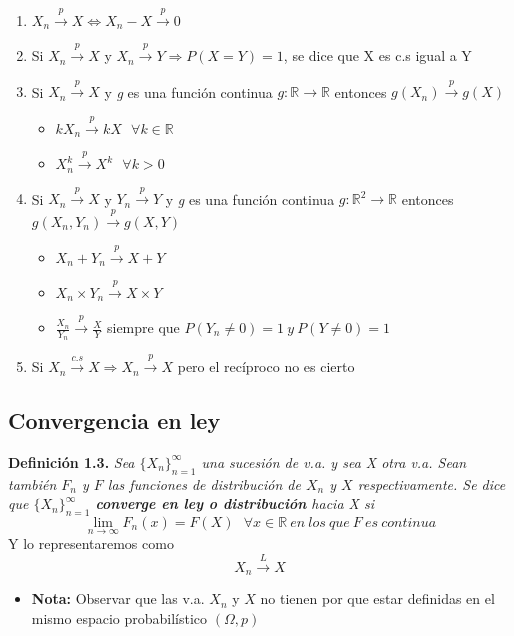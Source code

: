 	\begin{enumerate}
		\item $X_n\xrightarrow{p}X \iff X_n-X\xrightarrow{p}0$
		
		\item Si $X_n\xrightarrow{p}X$ y $X_n\xrightarrow{p}Y \Longrightarrow P(X=Y)=1$, se dice que X es c.s igual a Y
		
		\item Si $X_n\xrightarrow{p}X$ y \textit{g} es una función continua $g: \mathbb{R}\longrightarrow\mathbb{R}$ entonces \linebreak$g(X_n)\xrightarrow{p} g(X)$ \begin{itemize}
			\item $kX_n\xrightarrow{p}kX \ \ \  \forall k \in \mathbb{R}$
			
			\item $X_n^k\xrightarrow{p}X^k \ \ \  \forall k >0$
		\end{itemize}
		
		\item Si $X_n\xrightarrow{p}X$ y $Y_n\xrightarrow{p}Y$ y \textit{g} es una función continua $g: \mathbb{R}^2\longrightarrow\mathbb{R}$ entonces $g(X_n,Y_n)\xrightarrow{p}g(X,Y)$ \begin{itemize}
			\item $X_n+Y_n\xrightarrow{p}X+Y$
			
			\item $X_n \times Y_n\xrightarrow{p}X\times Y$
			
			\item $\frac{X_n}{Y_n}\xrightarrow{p}\frac{X}{Y}$ siempre que $P(Y_n\neq0)=1\  y\  P(Y\neq0)=1$
		\end{itemize}
		
		\item Si $X_n\xrightarrow{c.s}X \Longrightarrow X_n\xrightarrow{p}X$ pero el recíproco no es cierto
	\end{enumerate}
	
	\subsection{Convergencia en ley}
	
	\noindent\textbf{Definición 1.3.} \textit{Sea $\{X_n\}^{\infty}_{n=1}$ una sucesión de v.a. y sea X otra v.a. Sean también $F_n$ y $F$ las funciones de distribución de $X_n$ y $X$ respectivamente. Se dice que $\{X_n\}^{\infty}_{n=1}$ \textbf{converge en ley o distribución} hacia X si }
	$$\lim\limits_{n\rightarrow\infty}F_n(x)=F(X)\	\ \ \forall x\in \mathbb{R} \ en \ los\ que\ F\ es\ continua$$ Y lo representaremos como $$X_n\xrightarrow{L} X$$ 
		\begin{itemize}
		\item \textbf{Nota: }Observar que las v.a. $X_n$ y $X$ no tienen por que estar definidas en el mismo espacio probabilístico $(\Omega, p)$
		\end{itemize}
		
